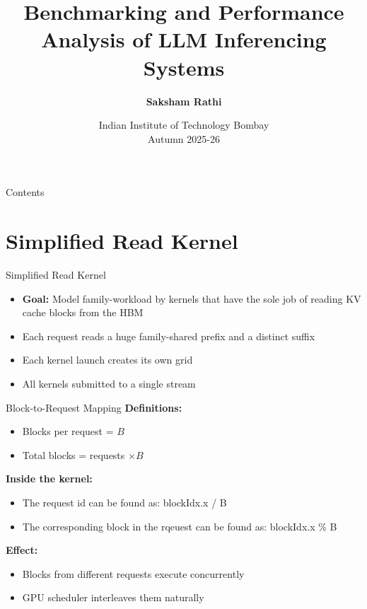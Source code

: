 \documentclass[Serif, 10pt, brown]{beamer}
\title[{Systems for LLMs}]{\sc Benchmarking and Performance Analysis of LLM Inferencing Systems}
\author[\ul{Saksham Rathi}]{{\textbf{Saksham Rathi}}}
\institute[UTD]{\sc\small Systems for LLMs\\ Under Prof. Mythili Vutukuru}
\date[UCI]{Indian Institute of Technology Bombay \\ Autumn 2025-26}
\theoremstyle{example}
\theoremstyle{plain}
\begin{document}
\frame{\titlepage}

\begin{frame}{Contents}
	\tableofcontents
\end{frame}

\section{Simplified Read Kernel}

\begin{frame}{Simplified Read Kernel}
    \begin{itemize}
        \item \textbf{Goal:} Model family-workload by kernels that have the sole job of reading KV cache blocks from the HBM
        \item Each request reads a huge family-shared prefix and a distinct suffix
        \item Each kernel launch creates its own grid
        \item All kernels submitted to a single stream
    \end{itemize}
\end{frame}

\begin{frame}{Block-to-Request Mapping}
\textbf{Definitions:}
\begin{itemize}
    \item Blocks per request = $B$
    \item Total blocks = requests $\times B$
\end{itemize}

\vspace{0.4cm}

\textbf{Inside the kernel:}
\begin{itemize}
    \item The request id can be found as: blockIdx.x / B
    \item The corresponding block in the rqeuest can be found as: blockIdx.x \% B
\end{itemize}

\vspace{0.4cm}

\textbf{Effect:}
\begin{itemize}
    \item Blocks from different requests execute concurrently
    \item GPU scheduler interleaves them naturally
\end{itemize}
\end{frame}
\end{document}
